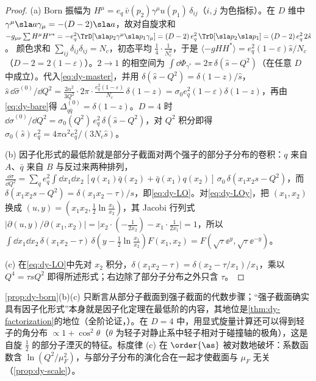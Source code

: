 \begin{proof}
(a) Born 振幅为 $H^\mu=e_q\,\bar v(p_2)\gamma^\mu u(p_1)\,\delta_{ij}$（$i,j$ 为色指标）。在 $D$ 维中 $\gamma^\mu\sla a\gamma_\mu=-(D-2)\sla a$，故对自旋求和
$-g_{\mu\nu}\sum H^\mu H^{\nu*}=-e_q^2\TrD[\sla p_2\gamma^\mu\sla p_1\gamma_\mu]=(D-2)\,e_q^2\,\TrD[\sla p_2\sla p_1]=(D-2)\,e_q^2\,2\hat s$。
颜色求和 $\sum_{ij}\delta_{ij}\delta_{ij}=N_c$，初态平均 $\frac14\cdot\frac1{N_c^2}$，于是 $\langle-gHH^*\rangle=e_q^2(1-\varepsilon)\hat s/N_c$（$D-2=2(1-\varepsilon)$）。$2\to1$ 的相空间为 $\int\dd\Phi_{\gamma^*}=2\pi\,\delta(\hat s-Q^2)$（在任意 $D$ 中成立）。代入\cref{eq:dy-master}，并用 $\delta(\hat s-Q^2)=\delta(1-z)/\hat s$，
$\hat s\,\dd\hat\sigma^{(0)}/\dd Q^2=\frac{2\alpha^2}{3Q^2}\cdot2\pi\cdot\frac{e_q^2(1-\varepsilon)}{N_c}\,\delta(1-z)=\sigma_0e_q^2(1-\varepsilon)\delta(1-z)$，再由\cref{eq:dy-bare}得 $\Delta^{(0)}_{q\bar q}=\delta(1-z)$。$D=4$ 时 $\dd\hat\sigma^{(0)}/\dd Q^2=\sigma_0(Q^2)\,e_q^2\,\delta(\hat s-Q^2)$，对 $Q^2$ 积分即得 $\sigma_0(\hat s)\,e_q^2=4\pi\alpha^2e_q^2/(3N_c\hat s)$。

(b) 因子化形式的最低阶就是部分子截面对两个强子的部分子分布的卷积：$q$ 来自 $A$、$\bar q$ 来自 $B$ 与反过来两种排列，
$\frac{\dd\sigma}{\dd Q^2}=\sum_qe_q^2\int\dd x_1\dd x_2\,[q(x_1)\bar q(x_2)+\bar q(x_1)q(x_2)]\,\sigma_0\,\delta(x_1x_2s-Q^2)$，而 $\delta(x_1x_2s-Q^2)=\delta(x_1x_2-\tau)/s$，即\cref{eq:dy-LO}。对\cref{eq:dy-LOy}，把 $(x_1,x_2)$ 换成 $(u,y)=(x_1x_2,\frac12\ln\frac{x_1}{x_2})$，其 Jacobi 行列式
$\big|\partial(u,y)/\partial(x_1,x_2)\big|=\big|x_2\cdot(-\tfrac{1}{2x_2})-x_1\cdot\tfrac{1}{2x_1}\big|=1$，所以 $\int\dd x_1\dd x_2\,\delta(x_1x_2-\tau)\,\delta(y-\frac12\ln\frac{x_1}{x_2})F(x_1,x_2)=F(\sqrt\tau\ee^{y},\sqrt\tau\ee^{-y})$。

(c) 在\cref{eq:dy-LO}中先对 $x_2$ 积分，$\delta(x_1x_2-\tau)=\delta(x_2-\tau/x_1)/x_1$，乘以 $Q^4=\tau sQ^2$ 即得所述形式；右边除了部分子分布之外只含 $\tau$。
\end{proof}

\cref{prop:dy-born}(b)(c) 只断言从部分子截面到强子截面的代数步骤；“强子截面确实具有因子化形式”本身就是因子化定理在最低阶的内容，其地位是\cref{thm:dy-factorization}的地位（全阶论证，\tagA）。在 $D=4$ 中，用显式旋量计算还可以得到轻子的角分布 $\propto1+\cos^2\theta$（$\theta$ 为轻子对静止系中轻子相对于碰撞轴的极角），这是自旋 $\frac12$ 的部分子湮灭的特征。标度律 (c) 在 $\order{\as}$ 被对数地破坏：系数函数含 $\ln(Q^2/\mu_F^2)$，与部分子分布的演化合在一起才使截面与 $\mu_F$ 无关（\cref{prop:dy-scale}）。
